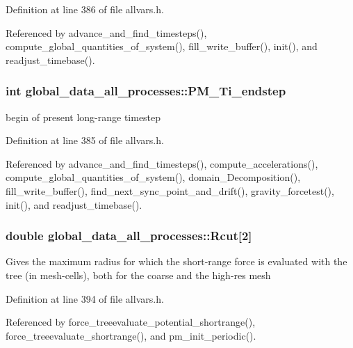 Definition at line 386 of file allvars.h.



Referenced by advance\_\-and\_\-find\_\-timesteps(), compute\_\-global\_\-quantities\_\-of\_\-system(), fill\_\-write\_\-buffer(), init(), and readjust\_\-timebase().

\hypertarget{structglobal__data__all__processes_a723a0aa2f2ac0ac4cc58ebc049dda9b3}{
\subsubsection[{PM\_\-Ti\_\-endstep}]{\setlength{\rightskip}{0pt plus 5cm}int {\bf global\_\-data\_\-all\_\-processes::PM\_\-Ti\_\-endstep}}}
\label{structglobal__data__all__processes_a723a0aa2f2ac0ac4cc58ebc049dda9b3}
begin of present long-\/range timestep 

Definition at line 385 of file allvars.h.



Referenced by advance\_\-and\_\-find\_\-timesteps(), compute\_\-accelerations(), compute\_\-global\_\-quantities\_\-of\_\-system(), domain\_\-Decomposition(), fill\_\-write\_\-buffer(), find\_\-next\_\-sync\_\-point\_\-and\_\-drift(), gravity\_\-forcetest(), init(), and readjust\_\-timebase().

\hypertarget{structglobal__data__all__processes_aeb7ceb2f4d86465e1febbfad5fa849d6}{
\subsubsection[{Rcut}]{\setlength{\rightskip}{0pt plus 5cm}double {\bf global\_\-data\_\-all\_\-processes::Rcut}\mbox{[}2\mbox{]}}}
\label{structglobal__data__all__processes_aeb7ceb2f4d86465e1febbfad5fa849d6}
Gives the maximum radius for which the short-\/range force is evaluated with the tree (in mesh-\/cells), both for the coarse and the high-\/res mesh 

Definition at line 394 of file allvars.h.



Referenced by force\_\-treeevaluate\_\-potential\_\-shortrange(), force\_\-treeevaluate\_\-shortrange(), and pm\_\-init\_\-periodic().

